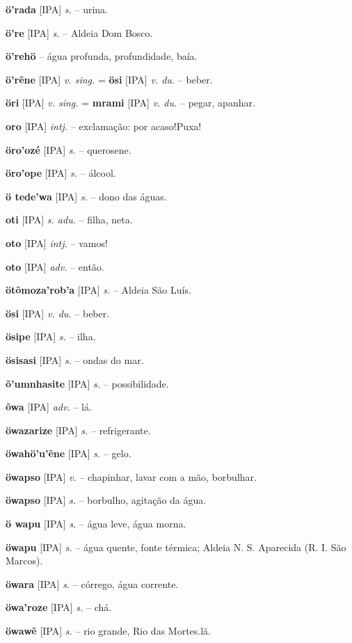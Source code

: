\textbf{ö'rada} [IPA] \textit{s.} -- urina.

\textbf{ö're} [IPA] \textit{s.} -- Aldeia Dom Bosco.

\textbf{ö'rehö} -- água profunda, profundidade, baía.

\textbf{ö'rẽne} [IPA] \textit{v. sing.} = \textbf{ösi} [IPA] \textit{v. du.} -- beber.

\textbf{öri} [IPA] \textit{v. sing.} = \textbf{mrami} [IPA] \textit{v. du.} -- pegar, apanhar.

\textbf{oro} [IPA] \textit{intj.} -- exclamação: por acaso!Puxa!

\textbf{öro'ozé} [IPA] \textit{s.} -- querosene.

\textbf{öro'ope} [IPA] \textit{s.} -- álcool.

\textbf{ö tede'wa} [IPA] \textit{s.} -- dono das águas.

\textbf{oti} [IPA] \textit{s. adu.} -- filha, neta.

\textbf{oto} [IPA] \textit{intj.} -- vamos!

\textbf{oto} [IPA] \textit{adv.} -- então.

\textbf{ötõmoza'rob'a} [IPA] \textit{s.} -- Aldeia São Luís.

\textbf{ösi} [IPA] \textit{v. du.} -- beber.

\textbf{ösipe} [IPA] \textit{s.} -- ilha.

\textbf{ösisasi} [IPA] \textit{s.} -- ondas do mar.

\textbf{õ'umnhasite} [IPA] \textit{s.} -- possibilidade.

\textbf{õwa} [IPA] \textit{adv.} -- lá.

\textbf{öwazarize} [IPA] \textit{s.} -- refrigerante.

\textbf{öwahö'u'ẽne} [IPA] \textit{s.} -- gelo.

\textbf{öwapso} [IPA] \textit{v.} -- chapinhar, lavar com a mão, borbulhar.

\textbf{öwapso} [IPA] \textit{s.} -- borbulho, agitação da água.

\textbf{ö wapu} [IPA] \textit{s.} -- água leve, água morna.

\textbf{öwapu} [IPA] \textit{s.} -- água quente, fonte térmica; Aldeia N. S. Aparecida (R. I. São Marcos).

\textbf{öwara} [IPA] \textit{s.} -- córrego, água corrente.

\textbf{öwa'roze} [IPA] \textit{s.} -- chá.

\textbf{öwawẽ} [IPA] \textit{s.} -- rio grande, Rio das Mortes.lã.

